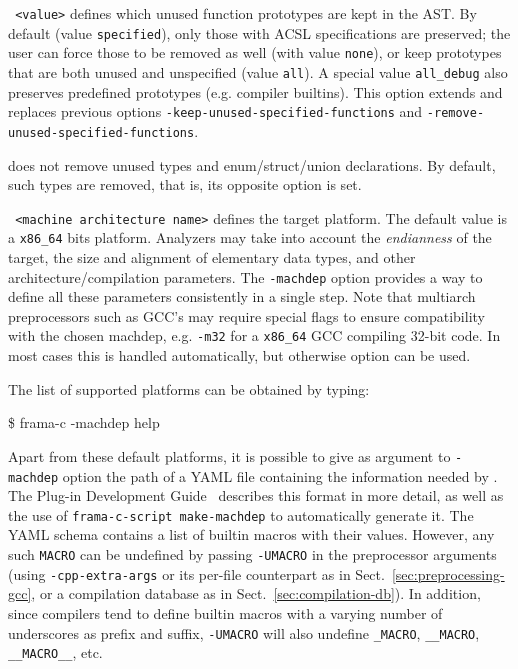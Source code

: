 \begin{description}
\item \texttt{ <value>} defines which
  unused function prototypes are kept in the AST. By default (value
  \texttt{specified}), only those with ACSL specifications are preserved;
  the user can force those to be removed as well (with value \texttt{none}),
  or keep prototypes that are both unused and unspecified (value \texttt{all}).
  A special value \texttt{all\_debug} also preserves predefined prototypes
  (e.g. compiler builtins).
  This option extends and replaces previous options
  \texttt{-keep-unused-specified-functions} and
  \texttt{-remove-unused-specified-functions}.

\item {} does not remove unused types and
  enum/struct/union declarations. By default, such types are removed,
  that is, its opposite option  is set.

\item \texttt{ <machine architecture name>} defines the
  target platform. The default value is a \texttt{x86\_64} bits
  platform. Analyzers may take into account the \emph{endianness} of the
  target, the size and alignment of elementary data types, and other
  architecture/compilation parameters. The \texttt{-machdep} option provides a
  way to define all these parameters consistently in a single step.
  Note that multiarch preprocessors such as GCC's may require special flags
  to ensure compatibility with the chosen machdep, e.g. \texttt{-m32} for a
  \texttt{x86\_64} GCC compiling 32-bit code. In most cases this is handled
  automatically, but otherwise option  can be used.

The list of supported platforms can be obtained by typing:
\begin{frama-c-commands}
\$ frama-c -machdep help
\end{frama-c-commands}

Apart from these default platforms, it is possible to give as argument
to \texttt{-machdep} option the path of a YAML file containing the information
needed by \FramaC. The Plug-in Development Guide~\cite{plugin-dev-guide} describes
this format in more detail, as well as the use of \texttt{frama-c-script make-machdep}
to automatically generate it. The YAML schema contains a list of builtin
macros with their values. However, any such \texttt{MACRO} can be undefined by passing
\texttt{-UMACRO} in the preprocessor arguments
(using \texttt{-cpp-extra-args} or its per-file counterpart as in
Sect.~\ref{sec:preprocessing-gcc},
or a compilation database as in Sect.~\ref{sec:compilation-db}). In addition,
since compilers tend to define builtin macros with a varying number of
underscores as prefix and suffix, \texttt{-UMACRO} will also undefine
\texttt{\_MACRO}, \texttt{\_\_MACRO}, \texttt{\_\_MACRO\_\_}, etc.


\end{description}
